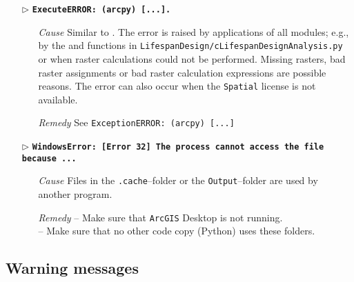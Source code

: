 \begin{itemize}
	\item[$\triangleright$]\textbf{\texttt{ExecuteERROR: (arcpy) [...].}}
	\begin{itemize}
		\item[\textit{Cause}\hspace{0.27cm}] Similar to . The error is raised by  applications of all modules; e.g., by the  and  functions in \texttt{LifespanDesign/cLifespanDesignAnalysis.py} or when raster calculations could not be performed. Missing rasters, bad raster assignments or bad raster calculation expressions are possible reasons. The error can also occur when the \texttt{Spatial} license is not available.
		\item[\textit{Remedy}] See \texttt{ExceptionERROR: (arcpy) [...]}\\
	\end{itemize}
	
	\item[$\triangleright$] \textbf{\texttt{WindowsError: [Error 32] The process cannot access the file because ...}}
	\begin{itemize}
		\item[\textit{Cause}\hspace{0.27cm}] Files in the \texttt{.cache}--folder or the \texttt{Output}--folder are used by another program.
		\item[\textit{Remedy}] -- Make sure that \texttt{ArcGIS} Desktop is not running.\\
													 -- Make sure that no other code copy (Python) uses these folders.\\
	\end{itemize}
\end{itemize}

\subsection{Warning messages}

